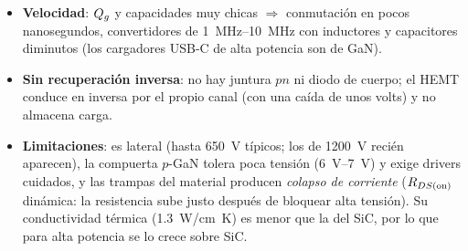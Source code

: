 \begin{itemize}
  \item \textbf{Velocidad}: $Q_{g}$ y capacidades muy chicas $\Rightarrow$ conmutación en pocos
  nanosegundos, convertidores de \SIrange{1}{10}{MHz} con inductores y capacitores diminutos (los
  cargadores USB-C de alta potencia son de GaN).
  \item \textbf{Sin recuperación inversa}: no hay juntura $pn$ ni diodo de cuerpo; el HEMT conduce en
  inversa por el propio canal (con una caída de unos volts) y no almacena carga.
  \item \textbf{Limitaciones}: es lateral (hasta \SI{650}{V} típicos; los de \SI{1200}{V} recién
  aparecen), la compuerta $p$-GaN tolera poca tensión (\SIrange{6}{7}{V}) y exige drivers cuidados,
  y las trampas del material producen \emph{colapso de corriente} ($R_{DS(\mathrm{on})}$ dinámica: la resistencia
  sube justo después de bloquear alta tensión). Su conductividad térmica (\SI{1.3}{W/cm.K}) es menor
  que la del SiC, por lo que para alta potencia se lo crece sobre SiC.
\end{itemize}
